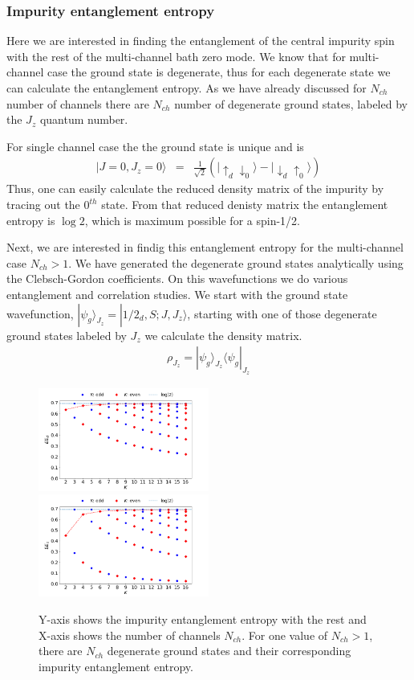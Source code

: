 \documentclass[reprint,prb,superscriptaddress]{revtex4-2}
\begin{document}
\subsubsection{Impurity entanglement entropy}
\noindent Here we are interested in finding the entanglement of the central impurity spin with the rest of the multi-channel bath zero mode. We know that for multi-channel case the ground state is degenerate, thus for each degenerate state we can calculate the entanglement entropy. As we have already discussed for $N_{ch}$ number of channels there are $N_{ch}$ number of degenerate ground states, labeled by the $J_z$ quantum number.\\
\par For single channel case the the ground state is unique and is 
\begin{eqnarray}
|J=0,J_z=0 \rangle &=& \frac{1}{\sqrt{2}} (|\uparrow_{d}\downarrow_0\rangle -|\downarrow_d \uparrow_0\rangle)
\end{eqnarray}
Thus, one can easily calculate the reduced density matrix of the impurity by tracing out the $0^{th}$ state. From that reduced denisty matrix the entanglement entropy is $\log 2$, which is maximum possible for a spin-1/2.
\par Next, we are interested in findig this entanglement entropy for the multi-channel case $N_{ch}>1$. We have generated the degenerate ground states analytically using the Clebsch-Gordon coefficients. On this wavefunctions we do various entanglement and correlation studies. We start with the ground state wavefunction, $|\psi_g\rangle_{J_z}=|1/2_{d},S;J,J_z\rangle$, starting with one of those degenerate ground states labeled by $J_z$ we calculate the density matrix.
\begin{eqnarray}
\rho_{J_z}=|\psi_g\rangle_{J_z} \langle\psi_g|_{J_z}
\end{eqnarray}

\begin{figure}[!ht]
\centering
\includegraphics[width=0.5\textwidth]{plt/EE_multi_channel_ANN.png}
\includegraphics[width=0.5\textwidth]{plt/outer_EE_multi_channel_ANN.png}
\caption{Y-axis shows the impurity entanglement entropy with the rest and X-axis shows the number of channels $N_{ch}$. For one value of $N_{ch}>1$, there are $N_{ch}$ degenerate ground states and their corresponding impurity entanglement entropy. }
\end{figure}
\end{document}
